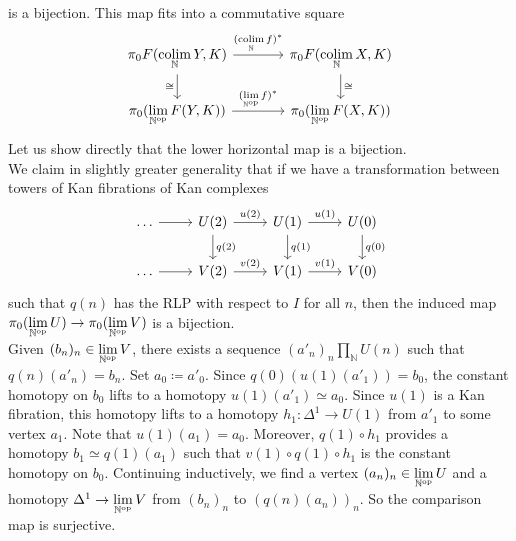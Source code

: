         is a bijection. This map fits into a commutative square
        \begin{equation*}
            \begin{tikzcd}[column sep=large]
                \pi_0 F(\colim\limits_{\mathbb{N}} Y, K) \arrow[d, "\cong"'] \arrow[r, "{(\colim\limits_{\mathbb{N}} f)^{*}}"] & \pi_0 F(\colim\limits_{\mathbb{N}} X, K) \arrow[d, "\cong"] \\
                \pi_0(\lim\limits_{\mathbb{N}^{\op}} F(Y, K)) \arrow[r, "{(\lim\limits_{\mathbb{N}^{\op}} f)^{*}}"] & \pi_0(\lim\limits_{\mathbb{N}^{\op}} F(X, K))
            \end{tikzcd}
        \end{equation*}
        Let us show directly that the lower horizontal map is a bijection.\\
        We claim in slightly greater generality that if we have a transformation between towers of Kan fibrations of Kan complexes
        \begin{equation*}
            \begin{tikzcd}
                \ldots \arrow[r] & U(2) \arrow[d, "{q(2)}"] \arrow[r, "{u(2)}"] & U(1) \arrow[d, "{q(1)}"] \arrow[r, "{u(1)}"] & U(0) \arrow[d, "{q(0)}"] \\
                \ldots \arrow[r] & V(2) \arrow[r, "{v(2)}"] & V(1) \arrow[r, "{v(1)}"] & V(0)
            \end{tikzcd}
        \end{equation*}
        such that $q(n)$ has the RLP with respect to $I$ for all $n$, then the induced map $\pi_0(\lim\limits_{\mathbb{N}^{\operatorname{op}}} U) \to \pi_0(\lim\limits_{\mathbb{N}^{\operatorname{op}}} V)$ is a bijection.\\
        Given $(b_n)_n \in \lim\limits_{\mathbb{N}^{\operatorname{op}}} V$, there exists a sequence $(a'_n)_n \prod_{\mathbb{N}} U(n)$ such that $q(n)(a'_n) = b_n$. Set $a_0 \coloneq a'_0$. Since $q(0)(u(1)(a'_1)) = b_0$, the constant homotopy on $b_0$ lifts to a homotopy $u(1)(a'_1) \simeq a_0$. Since $u(1)$ is a Kan fibration, this homotopy lifts to a homotopy $h_1 \colon \Delta^1 \to U(1)$ from $a'_1$ to some vertex $a_1$. Note that $u(1)(a_1) = a_0$. Moreover, $q(1) \circ h_1$ provides a homotopy $b_1 \simeq q(1)(a_1)$ such that $v(1) \circ q(1) \circ h_1$ is the constant homotopy on $b_0$. Continuing inductively, we find a vertex $(a_n)_n \in \lim\limits_{\mathbb{N}^{\operatorname{op}}} U$ and a homotopy $\Delta^1 \to \lim\limits_{\mathbb{N}^{\operatorname{op}}} V$ from $(b_n)_n$ to $(q(n)(a_n))_n$. So the comparison map is surjective.\\
